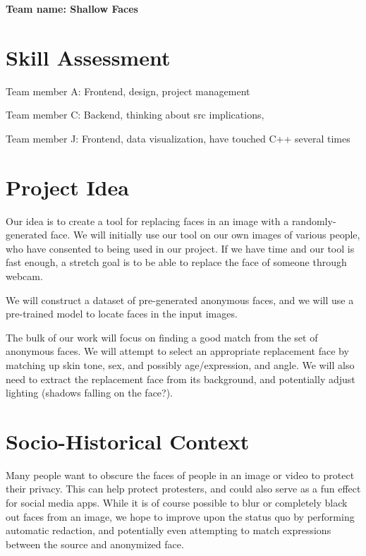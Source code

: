 
\textbf{Team name: Shallow Faces}

\section*{Skill Assessment}


Team member A: Frontend, design, project management

Team member C: Backend, thinking about src implications,

Team member J: Frontend, data visualization, have touched C++ several times


\section*{Project Idea}

Our idea is to create a tool for replacing faces in an image with a randomly-generated face. We will initially use our tool on our own images of various people, who have consented to being used in our project. If we have time and our tool is fast enough, a stretch goal is to be able to replace the face of someone through webcam.

We will construct a dataset of pre-generated anonymous faces, and we will use a pre-trained model to locate faces in the input images.

The bulk of our work will focus on finding a good match from the set of anonymous faces. We will attempt to select an appropriate replacement face by matching up skin tone, sex, and possibly age/expression, and angle. We will also need to extract the replacement face from its background, and potentially adjust lighting (shadows falling on the face?).

\section*{Socio-Historical Context}

Many people want to obscure the faces of people in an image or video to protect their privacy. This can help protect protesters, and could also serve as a fun effect for social media apps. While it is of course possible to blur or completely black out faces from an image, we hope to improve upon the status quo by performing automatic redaction, and potentially even attempting to match expressions between the source and anonymized face.

